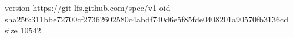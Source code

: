 version https://git-lfs.github.com/spec/v1
oid sha256:311bbe72700cf27362602580c4abdf740d6e5f85fde0408201a90570fb3136cd
size 10542
